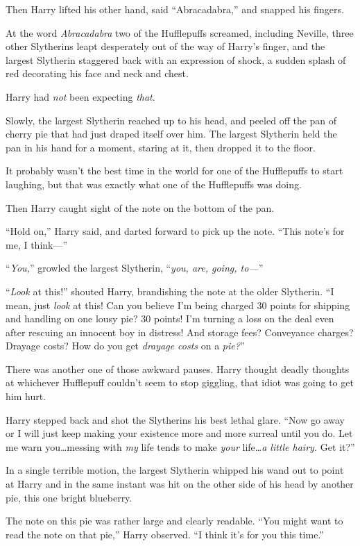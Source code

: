 Then Harry lifted his other hand, said “Abracadabra,” and snapped his fingers.

At the word \emph{Abracadabra} two of the Hufflepuffs screamed, including Neville, three other Slytherins leapt desperately out of the way of Harry’s finger, and the largest Slytherin staggered back with an expression of shock, a sudden splash of red decorating his face and neck and chest.

Harry had \emph{not} been expecting \emph{that}.

Slowly, the largest Slytherin reached up to his head, and peeled off the pan of cherry pie that had just draped itself over him. The largest Slytherin held the pan in his hand for a moment, staring at it, then dropped it to the floor.

It probably wasn’t the best time in the world for one of the Hufflepuffs to start laughing, but that was exactly what one of the Hufflepuffs was doing.

Then Harry caught sight of the note on the bottom of the pan.

“Hold on,” Harry said, and darted forward to pick up the note. “This note’s for me, I think—”

“\emph{You,}” growled the largest Slytherin, “\emph{you, are, going, to—}”

“\emph{Look} at this!” shouted Harry, brandishing the note at the older Slytherin. “I mean, just \emph{look} at this! Can you believe I’m being charged 30 points for shipping and handling on one lousy pie? 30 points! I’m turning a loss on the deal even after rescuing an innocent boy in distress! And storage fees? Conveyance charges? Drayage costs? How do you get \emph{drayage costs} on a \emph{pie?}”

There was another one of those awkward pauses. Harry thought deadly thoughts at whichever Hufflepuff couldn’t seem to stop giggling, that idiot was going to get him hurt.

Harry stepped back and shot the Slytherins his best lethal glare. “Now go away or I will just keep making your existence more and more surreal until you do. Let me warn you…messing with \emph{my} life tends to make \emph{your} life…\emph{a little hairy.} Get it?”

In a single terrible motion, the largest Slytherin whipped his wand out to point at Harry and in the same instant was hit on the other side of his head by another pie, this one bright blueberry.

The note on this pie was rather large and clearly readable. “You might want to read the note on that pie,” Harry observed. “I think it’s for you this time.”


